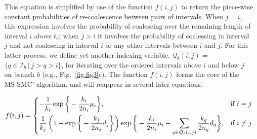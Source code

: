 \documentclass[11pt]{article}
\begin{document}
\noindent This equation is simplified by use of the function $f(i,j)$
to return the piece-wise constant probabilities of re-coalescence between
pairs of intervals. When $j=i$, this expression involves the probability of 
coalescing over the remaining length of interval $i$ above $t_r$; 
when $j>i$ it involves the probability of coalescing in interval 
$j$ and not coalescing in interval $i$ or any other intervals 
between $i$ and $j$. For this latter process, we define yet another 
indexing variable, $\mathcal{Q}_b(i,j)$ = $\{q \in \mathcal{I}_b ~|~ j > q > i\}$, 
for iterating over the ordered intervals above $i$ and below $j$ 
on branch $b$ (e.g., Fig.~\ref{fig:fig3}c).
The function $f(i,j)$ forms the core of the MS-SMC' algorithm, and 
will reappear in several later equations.

\begin{equation}
\begin{aligned}	
	f(i,j) = 
	\begin{dcases}
		- \frac{1}{k_i} \exp \bigg\{-\frac{k_i}{2n_i}\mu_i \bigg\}, 
		& \text{if } i=j\\
		\frac{1}{k_j} \left(1 - \exp \bigg\{ -\frac{k_j}{2n_j} d_j \bigg\} 
		\right)
		\exp \bigg\{ -\frac{k_i}{2n_i}\mu_i - 
		\sum_{q \in \mathcal{Q}_b(i,j)} \frac{k_q}{2n_q} d_q \bigg \}, 
		& \text{if } i\ne j\\
	\end{dcases}
\end{aligned}
\end{equation}


\end{document}
